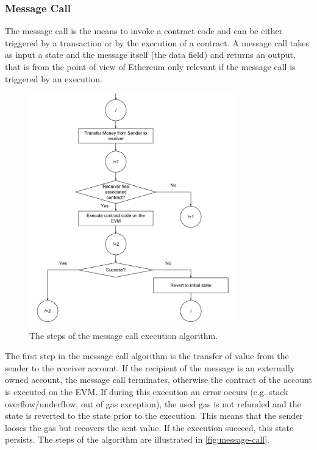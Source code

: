 \subsubsection{Message Call}
\label{sec:message-call}

The message call is the means to invoke a contract code and can be either
triggered by a transaction or by the execution of a contract. A message call
takes as input a state and the message itself (the data field) and returns an
output, that is from the point of view of Ethereum only relevant if the message
call is triggered by an execution.

\begin{figure}[h!]
	\begin{center}
		\includegraphics[width=0.79\textwidth]{./res/img/message-call.pdf}
	\end{center}
	\caption{The steps of the message call execution algorithm.}
	\label{fig:message-call}
\end{figure}

The first step in the message call algorithm is the transfer of value from the
sender to the receiver account. If the recipient of the message is an externally
owned account, the message call terminates, otherwise the contract of the
account is executed on the EVM. If during this execution an error occurs (e.g.
stack overflow/underflow, out of gas exception), the used gas is not refunded
and the state is reverted to the state prior to the execution. This means that
the sender looses the gas but recovers the sent value. If the execution succeed,
this state persists. The steps of the algorithm are illustrated in
\autoref{fig:message-call}.